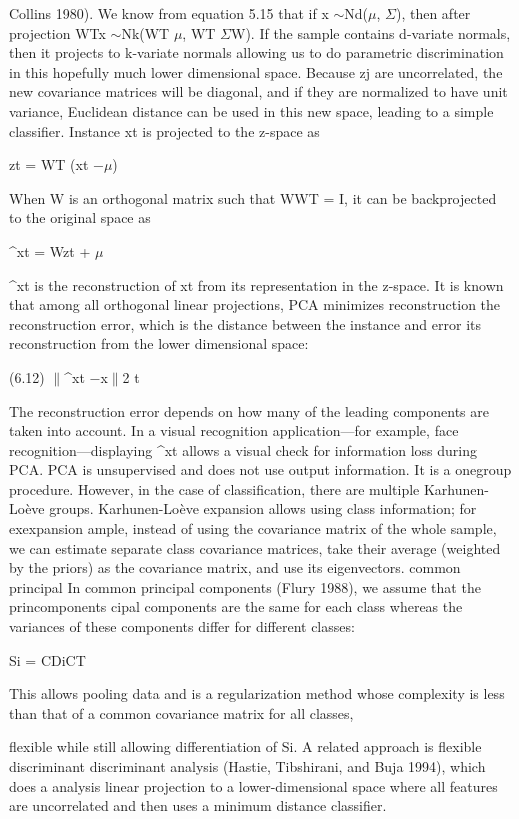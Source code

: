 Collins 1980). We know from equation 5.15 that if x $\sim$Nd($\mu$, $\Sigma$), then after projection WTx $\sim$Nk(WT $\mu$, WT $\Sigma$W). If the sample contains d-variate normals, then it projects to k-variate normals allowing us to do parametric discrimination in this hopefully much lower dimensional space. Because zj are uncorrelated, the new covariance matrices will be diagonal, and if they are normalized to have unit variance, Euclidean distance can be used in this new space, leading to a simple classifier. Instance xt is projected to the z-space as

zt = WT (xt $-$$\mu$)

When W is an orthogonal matrix such that WWT = I, it can be backprojected to the original space as

\textasciicircum{}xt = Wzt + $\mu$

\textasciicircum{}xt is the reconstruction of xt from its representation in the z-space. It is known that among all orthogonal linear projections, PCA minimizes reconstruction the reconstruction error, which is the distance between the instance and error its reconstruction from the lower dimensional space:

(6.12) $\parallel$\textasciicircum{}xt $-$x$\parallel$2 t

The reconstruction error depends on how many of the leading components are taken into account. In a visual recognition application---for example, face recognition---displaying \textasciicircum{}xt allows a visual check for information loss during PCA. PCA is unsupervised and does not use output information. It is a onegroup procedure. However, in the case of classification, there are multiple Karhunen-Loève groups. Karhunen-Loève expansion allows using class information; for exexpansion ample, instead of using the covariance matrix of the whole sample, we can estimate separate class covariance matrices, take their average (weighted by the priors) as the covariance matrix, and use its eigenvectors. common principal In common principal components (Flury 1988), we assume that the princomponents cipal components are the same for each class whereas the variances of these components differ for different classes:

Si = CDiCT

This allows pooling data and is a regularization method whose complexity is less than that of a common covariance matrix for all classes,

flexible while still allowing differentiation of Si. A related approach is flexible discriminant discriminant analysis (Hastie, Tibshirani, and Buja 1994), which does a analysis linear projection to a lower-dimensional space where all features are uncorrelated and then uses a minimum distance classifier.

